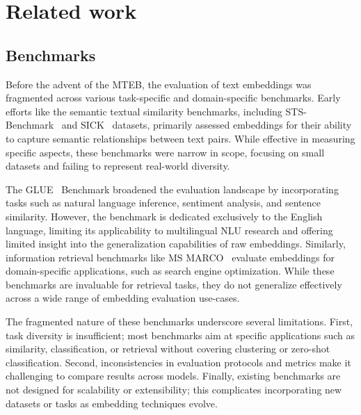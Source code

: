 \section{Related work}
\subsection{Benchmarks}
Before the advent of the MTEB\citep{muennighoff-etal-2023-mteb}, the evaluation of text embeddings was fragmented across various task-specific and domain-specific benchmarks. Early efforts like the semantic textual similarity benchmarks, including STS-Benchmark~\citep{cer-etal-2017-semeval} and SICK~\citep{marelli-etal-2014-sick} datasets, primarily assessed embeddings for their ability to capture semantic relationships between text pairs. While effective in measuring specific aspects, %
these benchmarks were narrow in scope, focusing on small datasets and failing to represent real-world diversity.

The GLUE~\citep{wang-etal-2018-glue} Benchmark broadened the evaluation landscape by incorporating tasks such as natural language inference, sentiment analysis, and sentence similarity. However, the benchmark is dedicated exclusively to the English language, limiting its applicability to multilingual NLU research and offering limited insight into the generalization capabilities of raw embeddings. Similarly, information retrieval benchmarks like MS MARCO~\citep{DBLP:journals/corr/NguyenRSGTMD16} evaluate embeddings for domain-specific applications, such as search engine optimization. While these benchmarks are invaluable for retrieval tasks, they do not generalize %
effectively across a wide range of embedding evaluation use-cases.


The fragmented nature of these benchmarks underscore several limitations. First, task diversity is insufficient; most benchmarks aim at specific applications such as similarity, classification, or retrieval without covering clustering or zero-shot classification. 
Second, inconsistencies in evaluation protocols and metrics make it challenging to compare results across models. Finally, existing benchmarks are not designed for scalability or extensibility; this complicates incorporating %
new datasets or tasks as embedding techniques evolve.

